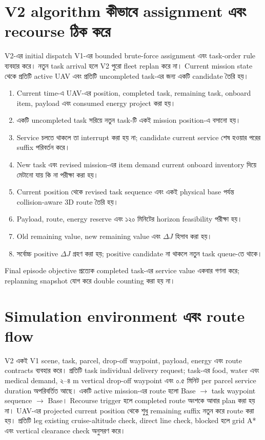 \documentclass[10pt,a4paper]{article}
\begin{document}
\section{V2 algorithm কীভাবে assignment এবং recourse ঠিক করে}
V2-এর initial dispatch V1-এর bounded brute-force assignment এবং task-order rule ব্যবহার করে। নতুন task arrival হলে V2 পুরো fleet replan করে না। Current mission state থেকে প্রতিটি active UAV এবং প্রতিটি uncompleted task-এর জন্য একটি candidate তৈরি হয়।
\begin{enumerate}
\item Current time-এ UAV-এর position, completed task, remaining task, onboard item, payload এবং consumed energy project করা হয়।
\item একটি uncompleted task সরিয়ে নতুন task-টি একই mission position-এ বসানো হয়।
\item Service চলতে থাকলে তা interrupt করা হয় না; candidate current service শেষ হওয়ার পরের suffix পরিবর্তন করে।
\item New task এবং revised mission-এর item demand current onboard inventory দিয়ে মেটানো যায় কি না পরীক্ষা করা হয়।
\item Current position থেকে revised task sequence এবং একই physical base পর্যন্ত collision-aware 3D route তৈরি হয়।
\item Payload, route, energy reserve এবং ১২০ মিনিটের horizon feasibility পরীক্ষা হয়।
\item Old remaining value, new remaining value এবং $\Delta J$ হিসাব করা হয়।
\item সর্বোচ্চ positive $\Delta J$ গ্রহণ করা হয়; positive candidate না থাকলে নতুন task queue-তে থাকে।
\end{enumerate}
Final episode objective প্রত্যেক completed task-এর service value একবার গণনা করে; replanning snapshot যোগ করে double counting করা হয় না।
\section{Simulation environment এবং route flow}
V2 একই V1 scene, task, parcel, drop-off waypoint, payload, energy এবং route contracts ব্যবহার করে। প্রতিটি task individual delivery request; task-এর food, water এবং medical demand, ২--৪ m vertical drop-off waypoint এবং ০.৫ মিনিট per parcel service duration অপরিবর্তিত আছে।
একটি active mission-এর route হলো Base $\rightarrow$ task waypoint sequence $\rightarrow$ Base। Recourse trigger হলে completed route অংশকে আবার plan করা হয় না। UAV-এর projected current position থেকে শুধু remaining suffix নতুন করে route করা হয়। প্রতিটি leg existing cruise-altitude check, direct line check, blocked হলে grid A* এবং vertical clearance check অনুসরণ করে।
\end{document}
